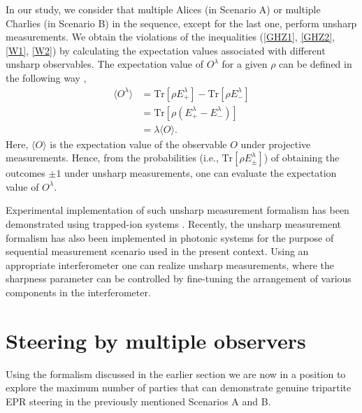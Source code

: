 \documentclass[pra,a4paper,aps,twocolumn,showpacs,superscriptaddress,groupedaddress]{revtex4}
\begin{document}
In our study, we  consider that multiple Alices (in Scenario A) or multiple Charlies (in Scenario B) in the sequence, except for the last one, perform unsharp measurements.  We obtain the violations of the inequalities (\ref{GHZ1}, \ref{GHZ2}, \ref{W1}, \ref{W2}) by calculating the expectation values associated with different unsharp observables. The expectation value of $O^{\lambda}$ for a given $\rho$ can be defined in the following way \cite{umn1,umn2},
\begin{align}
\langle O^{\lambda} \rangle &= \text{Tr}[\rho E^\lambda_{+}] - \text{Tr}[\rho E^\lambda_{-}] \nonumber \\
&= \text{Tr}[\rho (E^\lambda_{+} -  E^\lambda_{-})] \nonumber \\
&= \lambda \langle O \rangle.
\end{align}
Here, $\langle O \rangle$ is the expectation value of the observable $O$ under projective measurements. Hence, from the probabilities (i.e., $\text{Tr}[\rho E^\lambda_{\pm}]$) of obtaining the outcomes $\pm 1$ under unsharp measurements, one can evaluate the expectation value of $O^{\lambda}$. 

Experimental implementation of such unsharp measurement formalism has  been demonstrated using trapped-ion systems \cite{une1}. Recently, the unsharp measurement formalism has also been implemented in photonic systems \cite{exp1,exp2,Choi2020,exp4,rac1} for the purpose of sequential measurement scenario used in the present context. Using an appropriate interferometer one can realize  unsharp measurements, where the sharpness parameter can be controlled by fine-tuning the arrangement of various components in the interferometer.

\section{Steering by multiple observers}\label{s3}

Using the formalism discussed in the earlier section we are now in a position to explore the maximum number of parties that can demonstrate  genuine tripartite EPR steering in the previously mentioned Scenarios A and B. %
\end{document}
